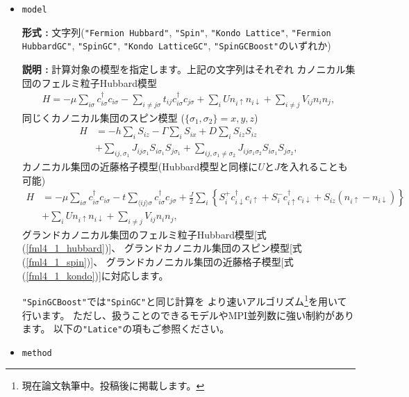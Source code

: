 \begin{itemize}

\item \verb|model|

{\bf 形式 :} 文字列(\verb|"Fermion Hubbard"|, \verb|"Spin"|, \verb|"Kondo Lattice"|, 
\verb|"Fermion HubbardGC"|, \verb|"SpinGC"|, \verb|"Kondo LatticeGC"|, 
\verb|"SpinGCBoost"|のいずれか)

{\bf 説明 :} 計算対象の模型を指定します。上記の文字列はそれぞれ
カノニカル集団のフェルミ粒子Hubbard模型
\begin{align}
H = - \mu \sum_{i \sigma} c^\dagger_{i \sigma} c_{i \sigma} 
- \sum_{i \neq j \sigma} t_{i j} c^\dagger_{i \sigma} c_{j \sigma} 
+ \sum_{i} U n_{i \uparrow} n_{i \downarrow}
+ \sum_{i \neq j} V_{i j} n_{i} n_{j},
\label{fml4_1_hubbard}
\end{align}
同じくカノニカル集団のスピン模型 ($\{\sigma_1, \sigma_2\}={x, y, z}$)
\begin{align}
H &= -h \sum_{i} S_{i z} - \Gamma \sum_{i} S_{i x} + D \sum_{i} S_{i z} S_{i z}
\nonumber \\
&+ \sum_{i j, \sigma_1}J_{i j \sigma_1} S_{i \sigma_1} S_{j \sigma_1}+ \sum_{i j, \sigma_1 \neq \sigma_2} J_{i j \sigma_1 \sigma_2} S_{i \sigma_1} S_{j \sigma_2} ,
\label{fml4_1_spin}
\end{align}
カノニカル集団の近藤格子模型(Hubbard模型と同様に$U$と$J$を入れることも可能)
\begin{align}
H &= - \mu \sum_{i \sigma} c^\dagger_{i \sigma} c_{i \sigma} 
- t \sum_{\langle i j \rangle \sigma} c^\dagger_{i \sigma} c_{j \sigma} 
+ \frac{J}{2} \sum_{i} \left\{
S_{i}^{+} c_{i \downarrow}^\dagger c_{i \uparrow}
+ S_{i}^{-} c_{i \uparrow}^\dagger c_{i \downarrow}
+ S_{i z} (n_{i \uparrow} - n_{i \downarrow})\right\}
\nonumber \\
& +  \sum_{i} U n_{i \uparrow} n_{i \downarrow}
+ \sum_{i \neq j} V_{i j} n_{i} n_{j}
,
\label{fml4_1_kondo}
\end{align}
グランドカノニカル集団のフェルミ粒子Hubbard模型[式(\ref{fml4_1_hubbard})]、
グランドカノニカル集団のスピン模型[式(\ref{fml4_1_spin})]、
グランドカノニカル集団の近藤格子模型[式(\ref{fml4_1_kondo})]に対応します。

\verb|"SpinGCBoost"|では\verb|"SpinGC"|と同じ計算を
より速いアルゴリズム\footnote{現在論文執筆中。投稿後に掲載します。}を用いて行います。
ただし、扱うことのできるモデルやMPI並列数に強い制約があります。
以下の\verb|"Latice"|の項もご参照ください。

\item \verb|method|
  

\end{itemize}
